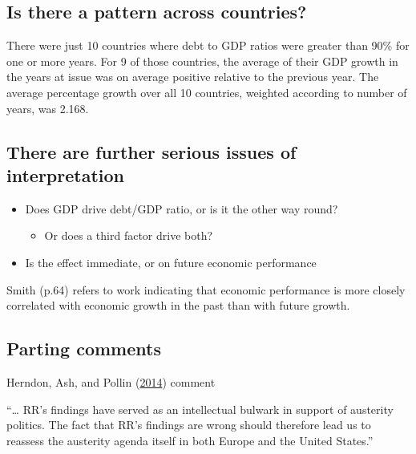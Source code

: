 \documentclass[
  10pt,
  b5paper]{book}
\providecommand{\tightlist}{%
  \setlength{\itemsep}{0pt}\setlength{\parskip}{0pt}}
\begin{document}
\hypertarget{is-there-a-pattern-across-countries}{%
\subsection*{Is there a pattern across countries?}\label{is-there-a-pattern-across-countries}}

There were just 10 countries where debt to GDP ratios were
greater than 90\% for one or more years. For 9 of
those countries, the average of their GDP growth in the years at issue
was on average positive relative to the previous year. The average
percentage growth over all 10 countries, weighted according
to number of years, was 2.168.

\hypertarget{there-are-further-serious-issues-of-interpretation}{%
\subsection*{There are further serious issues of interpretation}\label{there-are-further-serious-issues-of-interpretation}}

\begin{itemize}
\tightlist
\item
  Does GDP drive debt/GDP ratio, or is it the other way round?

  \begin{itemize}
  \tightlist
  \item
    Or does a third factor drive both?
  \end{itemize}
\item
  Is the effect immediate, or on future economic performance
\end{itemize}

Smith (p.64) refers to work indicating that economic performance
is more closely correlated with economic growth in the past than
with future growth.

\hypertarget{parting-comments}{%
\subsection*{Parting comments}\label{parting-comments}}

Herndon, Ash, and Pollin (\protect\hyperlink{ref-herndon2014does}{2014}) comment

``\ldots{} RR's findings have served as an intellectual bulwark in support of austerity politics. The fact that RR's findings are wrong should therefore lead us to reassess the austerity agenda itself in both Europe and the United States.''
\end{document}
